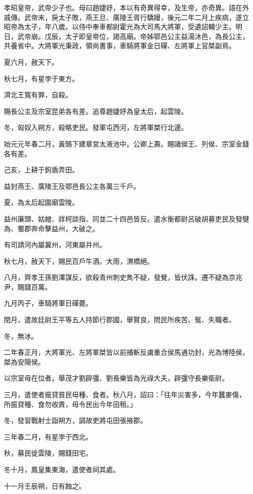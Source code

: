 
\begin{pinyinscope}
孝昭皇帝，武帝少子也。母曰趙婕妤，本以有奇異得幸，及生帝，亦奇異。語在外戚傳。武帝末，戾太子敗，燕王旦、廣陵王胥行驕嫚，後元二年二月上疾病，遂立昭帝為太子，年八歲。以侍中奉車都尉霍光為大司馬大將軍，受遺詔輔少主。明日，武帝崩。戊辰，太子即皇帝位，謁高廟。帝姊鄂邑公主益湯沐邑，為長公主，共養省中。大將軍光秉政，領尚書事，車騎將軍金日磾、左將軍上官桀副焉。

夏六月，赦天下。

秋七月，有星孛于東方。

濟北王寬有罪，自殺。

賜長公主及宗室昆弟各有差。追尊趙婕妤為皇太后，起雲陵。

冬，匈奴入朔方，殺略吏民。發軍屯西河，左將軍桀行北邊。

始元元年春二月，黃鵠下建章宮太液池中。公卿上壽。賜諸侯王、列侯、宗室金錢各有差。

己亥，上耕于鉤盾弄田。

益封燕王、廣陵王及鄂邑長公主各萬三千戶。

夏，為太后起園廟雲陵。

益州廉頭、姑繒、牂柯談指、同並二十四邑皆反。遣水衡都尉呂破胡募吏民及發犍為、蜀郡奔命擊益州，大破之。

有司請河內屬冀州，河東屬并州。

秋七月，赦天下，賜民百戶牛酒。大雨，渭橋絕。

八月，齊孝王孫劉澤謀反，欲殺青州刺史雋不疑，發覺，皆伏誅。遷不疑為京兆尹，賜錢百萬。

九月丙子，車騎將軍日磾薨。

閏月，遣故廷尉王平等五人持節行郡國，舉賢良，問民所疾苦、冤、失職者。

冬，無冰。

二年春正月，大將軍光、左將軍桀皆以前捕斬反虜重合侯馬通功封，光為博陸侯，桀為安陽侯。

以宗室毋在位者，舉茂才劉辟彊、劉長樂皆為光祿大夫，辟彊守長樂衛尉。

三月，遣使者振貸貧民毋種、食者。秋八月，詔曰：「往年災害多，今年蠶麥傷，所振貸種、食勿收責，毋令民出今年田租。」

冬，發習戰射士詣朔方，調故吏將屯田張掖郡。

三年春二月，有星孛于西北。

秋，募民徙雲陵，賜錢田宅。

冬十月，鳳皇集東海，遣使者祠其處。

十一月壬辰朔，日有蝕之。


\end{pinyinscope}
